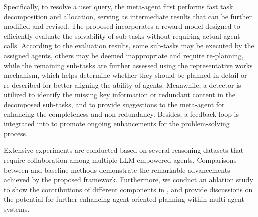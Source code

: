 Specifically, to resolve a user query, the meta-agent first performs fast task decomposition and allocation, serving as intermediate results that can be further modified and revised. The proposed \name incorporates a reward model designed to efficiently evaluate the solvability of sub-tasks without requiring actual agent calls.
According to the evaluation results, some sub-tasks may be executed by the assigned agents, others may be deemed inappropriate and require re-planning, while the remaining sub-tasks are further assessed using the representative works mechanism, which helps determine whether they should be planned in detail or re-described for better aligning the ability of agents.
Meanwhile, a detector is utilized to identify the missing key information or redundant content in the decomposed sub-tasks, and to provide suggestions to the meta-agent for enhancing the completeness and non-redundancy.
Besides, a feedback loop is integrated into \name to promote ongoing enhancements for the problem-solving process.

Extensive experiments are conducted based on several reasoning datasets that require collaboration among multiple LLM-empowered agents. Comparisons between \name and baseline methods demonstrate the remarkable advancements achieved by the proposed framework. 
Furthermore, we conduct an ablation study to show the contributions of different components in \name, and provide discussions on the potential for further enhancing agent-oriented planning within multi-agent systems.



